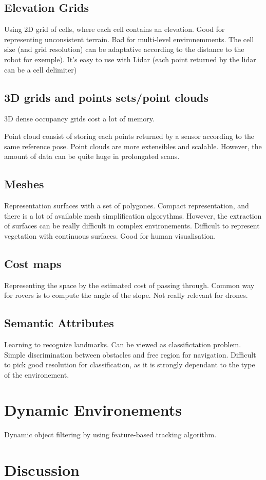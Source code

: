 \documentclass[twoside,twocolumn]{article}
\begin{document}
\subsection{Elevation Grids}
Using 2D grid of cells, where each cell contains an elevation.
Good for representing unconsistent terrain.
Bad for multi-level environemments.
The cell size (and grid resolution) can be adaptative according to the distance to the robot for exemple).
It's easy to use with Lidar (each point returned by the lidar can be a cell delimiter)

\subsection{3D grids and points sets/point clouds}
3D dense occupancy grids cost a lot of memory.

Point cloud consist of storing each points returned by a sensor according to the same reference pose.
Point clouds are more extensibles and scalable. However, the amount of data can be quite huge in prolongated scans.

\subsection{Meshes}
Representation surfaces with a set of polygones.
Compact representation, and there is a lot of available mesh simplification algorythms.
However, the extraction of surfaces can be really difficult in complex environements.
Difficult to represent vegetation with continuous surfaces.
Good for human visualisation.

\subsection{Cost maps}
Representing the space by the estimated cost of passing through.
Common way for rovers is to compute the angle of the slope.
Not really relevant for drones.

\subsection{Semantic Attributes}
Learning to recognize landmarks.
Can be viewed as classifictation problem.
Simple discrimination between obstacles and free region for navigation.
Difficult to pick good resolution for classification, as it is strongly dependant to the type of the environement.


\section{Dynamic Environements}
Dynamic object filtering by using feature-based tracking algorithm.


\section{Discussion}

\printbibliography
\end{document}
